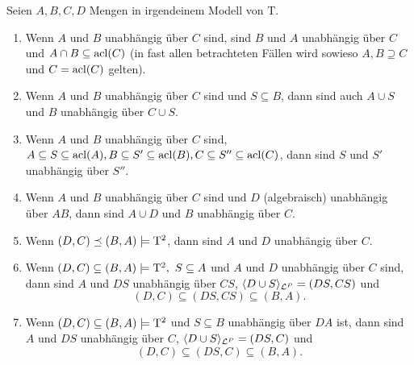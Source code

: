 \begin{lemma}\label{Unabhängigkeitsregeln}
	Seien $A,B,C,D$ Mengen in irgendeinem Modell von T.
	\begin{enumerate}
		\item Wenn $A$ und $B$ unabhängig über $C$ sind, sind $B$ und $A$ unabhängig über $C$ und $A\cap B\subseteq\operatorname{acl}(C)$ (in fast allen betrachteten Fällen wird sowieso $A,B\supseteq C$ und $C=\operatorname{acl}(C)$ gelten).
		\item Wenn $A$ und $B$ unabhängig über $C$ sind und $S\subseteq B$, dann sind auch $A\cup S$ und $B$ unabhängig über $C\cup S$.
		\item Wenn $A$ und $B$ unabhängig über $C$ sind, $A\subseteq S\subseteq\operatorname{acl}(A),B\subseteq S'\subseteq\operatorname{acl}(B),C\subseteq S''\subseteq\operatorname{acl}(C)$, dann sind $S$ und $S'$ unabhängig über $S''$.
		\item Wenn $A$ und $B$ unabhängig über $C$ sind und $D$ (algebraisch) unabhängig über $AB$, dann sind $A\cup D$ und $B$ unabhängig über $C$.
		\item Wenn $(D,C)\preceq(B,A)\models\operatorname{T^2}$, dann sind $A$ und $D$ unabhängig über $C$.
		\item Wenn $(D,C)\subseteq(B,A)\models\tq,\ S\subseteq A$ und $A$ und $D$ unabhängig über $C$ sind, dann sind $A$ und $DS$ unabhängig über $CS$, $\langle D\cup S\rangle_{\mathcal{L}^P}=(DS,CS)$ und $$(D,C)\subseteq(DS,CS)\subseteq(B,A).$$
		\item Wenn $(D,C)\subseteq(B,A)\models\operatorname{T^2}$ und $S\subseteq B$ unabhängig über $DA$ ist, dann sind $A$ und $DS$ unabhängig über $C$, $\langle D\cup S\rangle_{\mathcal{L}^P}=(DS,C)$ und $$(D,C)\subseteq(DS,C)\subseteq(B,A).$$
	\end{enumerate}
\end{lemma}
\newpage
